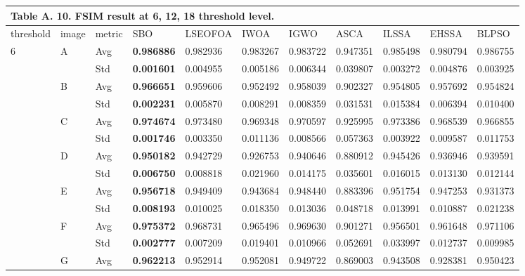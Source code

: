 \documentclass{article} %
\begin{document}
\begin{tabular}{|p{0.5in}|p{0.3in}|p{0.3in}|p{0.5in}|p{0.6in}|p{0.5in}|p{0.5in}|p{0.5in}|p{0.5in}|p{0.5in}|p{0.5in}|} \hline 
\multicolumn{11}{|p{1in}|}{\textbf{Table A. }10\textbf{.} FSIM result at 6, 12, 18 threshold level.} \\ \hline 
threshold & image & metric & SBO & LSEOFOA & IWOA & IGWO & ASCA & ILSSA & EHSSA & BLPSO \\ \hline 
6 & A & Avg & \textbf{0.986886 } & 0.982936  & 0.983267  & 0.983722  & 0.947351  & 0.985498  & 0.980794  & 0.986755  \\ \hline 
 &  & Std & \textbf{0.001601 } & 0.004955  & 0.005186  & 0.006344  & 0.039807  & 0.003272  & 0.004876  & 0.003925  \\ \hline 
 & B & Avg & \textbf{0.966651 } & 0.959606  & 0.952492  & 0.958039  & 0.902327  & 0.954805  & 0.957692  & 0.954824  \\ \hline 
 &  & Std & \textbf{0.002231 } & 0.005870  & 0.008291  & 0.008359  & 0.031531  & 0.015384  & 0.006394  & 0.010400  \\ \hline 
 & C & Avg & \textbf{0.974674 } & 0.973480  & 0.969348  & 0.970597  & 0.925995  & 0.973386  & 0.968539  & 0.966855  \\ \hline 
 &  & Std & \textbf{0.001746 } & 0.003350  & 0.011136  & 0.008566  & 0.057363  & 0.003922  & 0.009587  & 0.011753  \\ \hline 
 & D & Avg & \textbf{0.950182 } & 0.942729  & 0.926753  & 0.940646  & 0.880912  & 0.945426  & 0.936946  & 0.939591  \\ \hline 
 &  & Std & \textbf{0.006750 } & 0.008818  & 0.021960  & 0.014175  & 0.035601  & 0.016015  & 0.013130  & 0.012144  \\ \hline 
 & E & Avg & \textbf{0.956718 } & 0.949409  & 0.943684  & 0.948440  & 0.883396  & 0.951754  & 0.947253  & 0.931373  \\ \hline 
 &  & Std & \textbf{0.008193 } & 0.010025  & 0.018350  & 0.013036  & 0.048718  & 0.013991  & 0.010887  & 0.021238  \\ \hline 
 & F & Avg & \textbf{0.975372 } & 0.968731  & 0.965496  & 0.969630  & 0.901271  & 0.956501  & 0.961648  & 0.971106  \\ \hline 
 &  & Std & \textbf{0.002777 } & 0.007209  & 0.019401  & 0.010966  & 0.052691  & 0.033997  & 0.012737  & 0.009985  \\ \hline 
 & G & Avg & \textbf{0.962213 } & 0.952914  & 0.952081  & 0.949722  & 0.869003  & 0.943508  & 0.928381  & 0.950423  \\ \hline 

\end{tabular}
\end{document}
